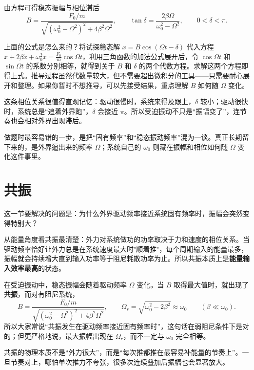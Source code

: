 \documentclass[lang=cn,11pt]{elegantbook}
\newcommand{\bridge}[1]{\begin{note}#1\end{note}}
\begin{document}
由方程可得稳态振幅与相位滞后
\[
B=\frac{F_0/m}{\sqrt{(\omega_0^2-\Omega^2)^2+4\beta^2\Omega^2}},\qquad
\tan\delta=\frac{2\beta\Omega}{\omega_0^2-\Omega^2},\qquad 0<\delta<\pi.
\]

\begin{remark}
上面的公式是怎么来的？将试探稳态解 \(x=B\cos(\Omega t-\delta)\) 代入方程 \(\ddot{x}+2\beta\dot{x}+\omega_0^2 x=\frac{F_0}{m}\cos\Omega t\)，利用三角函数的加法公式展开后，令 \(\cos\Omega t\) 和 \(\sin\Omega t\) 的系数分别相等，就得到关于 \(B\) 和 \(\delta\) 的两个代数方程。求解这两个方程即得上式。推导过程虽然代数量较大，但不需要超出微积分的工具——只需要耐心展开和整理。如果你暂时不想推导，可以先接受结果，重点理解 \(B\) 如何随 \(\Omega\) 变化。
\end{remark}

\begin{note}
这条相位关系很值得直观记忆：驱动很慢时，系统来得及跟上，\(\delta\) 较小；驱动很快时，系统总是“追着外界跑”，\(\delta\) 会接近 \(\pi\)。所以受迫振动不只是“振幅变了”，连节奏也会相对外界出现滞后。
\end{note}

\begin{remark}
做题时最容易错的一步，是把“固有频率”和“稳态振动频率”混为一谈。真正长期留下来的，是外界逼出来的频率 \(\Omega\)；系统自己的 \(\omega_0\) 则藏在振幅和相位如何随 \(\Omega\) 变化这件事里。
\end{remark}

\section{共振}

这一节要解决的问题是：为什么外界驱动频率接近系统固有频率时，振幅会突然变得特别大？

\bridge{从能量角度看共振最清楚：外力对系统做功的功率取决于力和速度的相位关系。当驱动频率恰好让外力总是在系统速度最大时"顺着推"，每个周期输入的能量最多，振幅就会持续增大直到输入功率等于阻尼耗散功率为止。所以共振本质上是\textbf{能量输入效率最高}的状态。}

在受迫振动中，稳态振幅会随着驱动频率 \(\Omega\) 变化。当 \(B\) 取得最大值时，就出现了\textbf{共振}，而对有阻尼系统，
\[
B=\frac{F_0/m}{\sqrt{(\omega_0^2-\Omega^2)^2+4\beta^2\Omega^2}},\qquad
\Omega_r=\sqrt{\omega_0^2-2\beta^2}\approx \omega_0 \qquad (\beta\ll\omega_0).
\]
所以大家常说“共振发生在驱动频率接近固有频率时”，这句话在弱阻尼条件下是对的；但更严格地说，最大振幅出现在 \(\Omega_r\)，而不一定与 \(\omega_0\) 完全相等。

\bridge{共振的物理本质不是“外力很大”，而是“每次推都推在最容易补能量的节奏上”。一旦节奏对上，哪怕单次推力不夸张，很多次连续叠加后振幅也会显著放大。}
\end{document}
